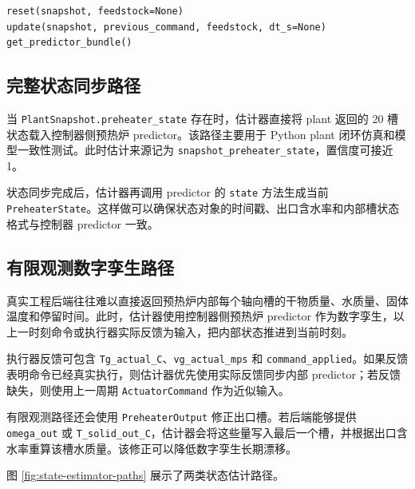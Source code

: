 \documentclass[UTF8,openany,zihao=-4,oneside]{ctexbook}
\providecommand{\passthrough}[1]{#1}
\begin{document}
\begin{lstlisting}
reset(snapshot, feedstock=None)
update(snapshot, previous_command, feedstock, dt_s=None)
get_predictor_bundle()
\end{lstlisting}

\subsection{完整状态同步路径}\label{subsec:full-state-sync}

当 \passthrough{\lstinline!PlantSnapshot.preheater_state!} 存在时，估计器直接将 plant 返回的 20 槽状态载入控制器侧预热炉 predictor。该路径主要用于 Python plant 闭环仿真和模型一致性测试。此时估计来源记为 \passthrough{\lstinline!snapshot_preheater_state!}，置信度可接近 1。

状态同步完成后，估计器再调用 predictor 的 \passthrough{\lstinline!state!} 方法生成当前 \passthrough{\lstinline!PreheaterState!}。这样做可以确保状态对象的时间戳、出口含水率和内部槽状态格式与控制器 predictor 一致。

\subsection{有限观测数字孪生路径}\label{subsec:limited-observation-estimation}

真实工程后端往往难以直接返回预热炉内部每个轴向槽的干物质量、水质量、固体温度和停留时间。此时，估计器使用控制器侧预热炉 predictor 作为数字孪生，以上一时刻命令或执行器实际反馈为输入，把内部状态推进到当前时刻。

执行器反馈可包含 \passthrough{\lstinline!Tg_actual_C!}、\passthrough{\lstinline!vg_actual_mps!} 和 \passthrough{\lstinline!command_applied!}。如果反馈表明命令已经真实执行，则估计器优先使用实际反馈同步内部 predictor；若反馈缺失，则使用上一周期 \passthrough{\lstinline!ActuatorCommand!} 作为近似输入。

有限观测路径还会使用 \passthrough{\lstinline!PreheaterOutput!} 修正出口槽。若后端能够提供 \passthrough{\lstinline!omega_out!} 或 \passthrough{\lstinline!T_solid_out_C!}，估计器会将这些量写入最后一个槽，并根据出口含水率重算该槽水质量。该修正可以降低数字孪生长期漂移。

图 \ref{fig:state-estimator-paths} 展示了两类状态估计路径。
\end{document}
